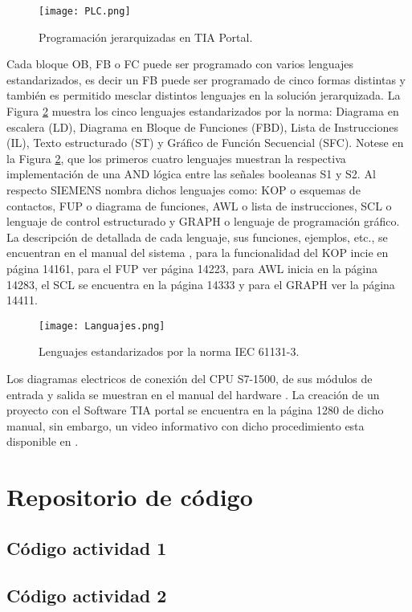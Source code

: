 \begin{figure}[H]
	\centering
	\texttt{[image: PLC.png]}
	\caption{Programación jerarquizadas en TIA Portal.}
	\label{fig:plc}
\end{figure}


Cada bloque OB, FB o FC puede ser programado con varios lenguajes estandarizados, es decir un FB puede ser programado de cinco formas distintas y también es permitido mesclar distintos lenguajes en la solución jerarquizada. La Figura \ref{fig:languajes} muestra los cinco lenguajes estandarizados por la norma: Diagrama en escalera (LD), Diagrama en Bloque de Funciones (FBD), Lista de Instrucciones (IL), Texto estructurado (ST) y Gráfico de Función Secuencial (SFC). Notese en la Figura \ref{fig:languajes}, que los primeros cuatro lenguajes muestran la respectiva implementación de una AND lógica entre las señales booleanas  S1  y S2. Al respecto SIEMENS nombra dichos lenguajes como: KOP o esquemas de contactos, FUP o diagrama de funciones, AWL o lista de instrucciones, SCL o lenguaje de control estructurado y GRAPH o lenguaje de programación gráfico. La descripción de detallada de cada lenguaje, sus funciones, ejemplos, etc., se encuentran en el manual del sistema \cite{TIA-S7}, para la funcionalidad del KOP incie en página 14161, para el FUP ver página 14223, para  AWL inicia en la página 14283, el SCL se encuentra en la página 14333 y para el GRAPH ver la página 14411.

\begin{figure}
	\centering
	\texttt{[image: Languajes.png]}
	\caption{Lenguajes estandarizados por la norma IEC 61131-3.}
	\label{fig:languajes}
\end{figure}


Los diagramas electricos de conexión del CPU S7-1500, de sus módulos de entrada y salida se muestran en el manual del hardware \cite{PLC-1500}. La creación de un proyecto con el Software TIA portal se encuentra en la página  1280 de dicho manual, sin embargo, un video informativo con dicho procedimiento esta disponible en \cite{Maria}. 

\chapter{Repositorio de código}
\label{ap:osc}
\section{Código actividad 1}
\label{ApendiceA1}
{\scriptsize 
    
}

\section{Código actividad 2}
\label{ApendiceA2}
{\scriptsize 
    
}	

